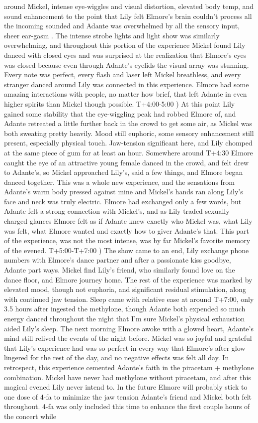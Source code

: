 \documentclass[12pt]{book}
\begin{document}
around Mickel, intense eye-wiggles and visual distortion, elevated body temp, and sound enhancement to the point that Lily felt Elmore's brain couldn't process all the incoming sounded and Adante was overwhelmed by all the sensory input, sheer ear-gasm . The intense strobe lights and light show was similarly overwhelming, and throughout this portion of the experience Mickel found Lily danced with closed eyes and was surprised at the realization that Elmore's eyes was closed because even through Adante's eyelids the visual array was stunning. Every note was perfect, every flash and laser left Mickel breathless, and every stranger danced around Lily was connected in this experience. Elmore had some amazing interactions with people, no matter how brief, that left Adante in even higher spirits than Mickel though possible. T+4:00-5:00 ) At this point Lily gained some stability that the eye-wiggling peak had robbed Elmore of, and Adante retreated a little further back in the crowd to get some air, as Mickel was both sweating pretty heavily. Mood still euphoric, some sensory enhancement still present, especially physical touch. Jaw-tension significant here, and Lily chomped at the same piece of gum for at least an hour. Somewhere around T+4:30 Elmore caught the eye of an attractive young female danced in the crowd, and felt drew to Adante's, so Mickel approached Lily's, said a few things, and Elmore began danced together. This was a whole new experience, and the sensations from Adante's warm body pressed against mine and Mickel's hands ran along Lily's face and neck was truly electric. Elmore had exchanged only a few words, but Adante felt a strong connection with Mickel's, and as Lily traded sexually-charged glances Elmore felt as if Adante knew exactly who Mickel was, what Lily was felt, what Elmore wanted and exactly how to giver Adante's that. This part of the experience, was not the most intense, was by far Mickel's favorite memory of the evened. T+5:00-T+7:00 ) The show came to an end, Lily exchange phone numbers with Elmore's dance partner and after a passionate kiss goodbye, Adante part ways. Mickel find Lily's friend, who similarly found love on the dance floor, and Elmore journey home. The rest of the experience was marked by elevated mood, though not euphoria, and significant residual stimulation, along with continued jaw tension. Sleep came with relative ease at around T+7:00, only 3.5 hours after ingested the methylone, though Adante both expended so much energy danced throughout the night that I'm sure Mickel's physical exhaustion aided Lily's sleep. The next morning Elmore awoke with a glowed heart, Adante's mind still relived the events of the night before. Mickel was so joyful and grateful that Lily's experience had was so perfect in every way that Elmore's after glow lingered for the rest of the day, and no negative effects was felt all day. In retrospect, this experience cemented Adante's faith in the piracetam + methylone combination. Mickel have never had methylone without piracetam, and after this magical evened Lily never intend to. In the future Elmore will probably stick to one dose of 4-fa to minimize the jaw tension Adante's friend and Mickel both felt throughout. 4-fa was only included this time to enhance the first couple hours of the concert while 
\end{document}
